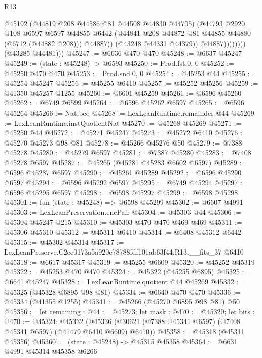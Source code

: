 \begin{lexlean}{R13}
\begin{coremodule}
                            @45192
                            (@44819 @208 @44586 @81 @44508 @44830 @44705)
                            (@44793
                              @2920
                              @108
                              @6597
                              @6597
                              @44855
                              @6442
                              (@44841 @208 @44872 @81 @44855 @44880 (@6712 (@44882 @208)))
                              @44887))
                          (@43248 @44331 @44379))
                        @44887))))))))
        (@43285 @44481)))
@45247 := @6636 @470 @470
@45248 := @6637 @45247
@45249 := (state : @45248) -> @6593
@45250 := Prod.fst.{0, 0}
@45252 := @45250 @470 @470
@45253 := Prod.snd.{0, 0}
@45254 := @45253 @44
@45255 := @45254 @45247
@45256 := @45255 @6410
@45257 := @45252 @45256
@45259 := @41350 @45257 @1255
@45260 := @6601 @45259
@45261 := @6596 @45260
@45262 := @6749 @6599
@45264 := @6596 @45262 @6597
@45265 := @6596 @45264
@45266 := Nat.beq
@45268 := LexLeanRuntime.remainder @44
@45269 := LexLeanRuntime.instQuotientNat
@45270 := @45268 @45269
@45271 := @45250 @44
@45272 := @45271 @45247
@45273 := @45272 @6410
@45276 := @45270 @45273 @98 @81
@45278 := @45266 @45276 @50
@45279 := @7388 @45278
@45280 := @45279 @6597
@45281 := @7387 @45280
@45283 := @7408 @45278 @6597
@45287 := @45265 (@45281 @45283 @6602 @6597)
@45289 := @6596 @45287 @6597
@45290 := @45261 @45289
@45292 := @6596 @45290 @6597
@45294 := @6596 @45292 @6597
@45295 := @6749 @45294
@45297 := @6596 @45295 @6597
@45298 := @6598 @45297
@45299 := @6598 @45298
@45301 := fun (state : @45248) => @6598 @45299
@45302 := @6607 @4991
@45303 := LexLeanPreservation.encPair
@45304 := @45303 @44
@45306 := @45304 @45247 @215
@45310 := @45303 @470 @470 @469 @469
@45311 := @45306 @45310
@45312 := @45311 @6410
@45314 := @6408 @45312 @6442
@45315 := @45302 @45314
@45317 := LexLeanPreserve.C2ee0173a5a920c78788fdf101ab63f44.R13.__fits_37 @6410
@45318 := @6617 @45317
@45319 := @45255 @6609
@45320 := @45252 @45319
@45322 := @45253 @470 @470
@45324 := @45322 (@45255 @6895)
@45325 := @6641 @45247
@45328 := LexLeanRuntime.quotient @44 @45269
@45332 := @45325 (@45328 @6895 @98 @81)
@45334 := @6640 @470 @470
@45336 := @45334 (@41355 @1255)
@45341 := @45266 (@45270 @6895 @98 @81) @50
@45356 := let remaining : @44 := @45273;
  let mask : @470 := @45320;
  let bits : @470 := @45324;
  @45332 (@45336 (@30621 (@7388 @45341 @6597) (@7408 @45341 @6597) (@41479 @6410 @6609) @6410))
@45358 := @45318 (@45311 @45356)
@45360 := (state : @45248) -> @45315 @45358
@45364 := @6631 @4991 @45314 @45358 @6266

\end{coremodule}
\end{lexlean}
